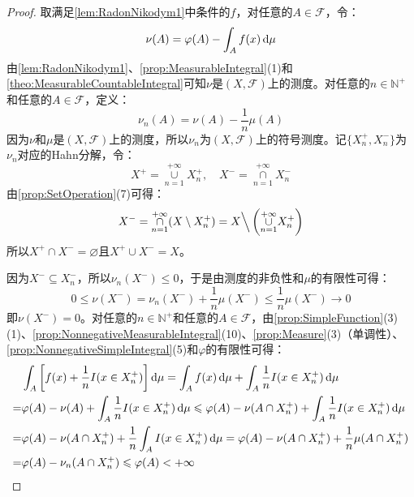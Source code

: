 \begin{proof}
	取满足\cref{lem:RadonNikodym1}中条件的$f$，对任意的$A\in\mathscr{F}$，令：
	\begin{equation*}
		\nu(A)=\varphi(A)-\int_{A}f(x)\mathop{}\!\mathrm{d}\mu
	\end{equation*}
	由\cref{lem:RadonNikodym1}、\cref{prop:MeasurableIntegral}(1)和\cref{theo:MeasurableCountableIntegral}可知$\nu$是$(X,\mathscr{F})$上的测度。对任意的$n\in\mathbb{N}^+$和任意的$A\in\mathscr{F}$，定义：
	\begin{equation*}
		\nu_n(A)=\nu(A)-\frac{1}{n}\mu(A)
	\end{equation*}
	因为$\nu$和$\mu$是$(X,\mathscr{F})$上的测度，所以$\nu_n$为$(X,\mathscr{F})$上的符号测度。记$\{X_n^+,X_n^-\}$为$\nu_n$对应的Hahn分解，令：
	\begin{equation*}
		X^+=\underset{n=1}{\overset{+\infty}{\cup}}X_n^+,\quad X^-=\underset{n=1}{\overset{+\infty}{\cap}}X_n^-
	\end{equation*}
	由\cref{prop:SetOperation}(7)可得：
	\begin{equation*}
		X^-=\underset{n=1}{\overset{+\infty}{\cap}}(X\setminus X_n^+)=X\Big\backslash\left(\underset{n=1}{\overset{+\infty}{\cup}}X_n^+\right)
	\end{equation*}
	所以$X^+\cap X^-=\varnothing$且$X^+\cup X^-=X$。\par
	因为$X^-\subseteq X_n^-$，所以$\nu_n(X^-)\leqslant0$，于是由测度的非负性和$\mu$的有限性可得：
	\begin{equation*}
		0\leqslant\nu(X^-)=\nu_n(X^-)+\frac{1}{n}\mu(X^-)\leqslant\frac{1}{n}\mu(X^-)\to0
	\end{equation*}
	即$\nu(X^-)=0$。对任意的$n\in\mathbb{N}^+$和任意的$A\in\mathscr{F}$，由\cref{prop:SimpleFunction}(3)(1)、\cref{prop:NonnegativeMeasurableIntegral}(10)、\cref{prop:Measure}(3)（单调性）、\cref{prop:NonnegativeSimpleIntegral}(5)和$\varphi$的有限性可得：
	\begin{align*}
		&\int_{A}\left[f(x)+\frac{1}{n}I(x\in X_n^+)\right]\mathop{}\!\mathrm{d}\mu=\int_{A}f(x)\mathop{}\!\mathrm{d}\mu+\int_{A}\frac{1}{n}I(x\in X_n^+)\mathop{}\!\mathrm{d}\mu \\
		=&\varphi(A)-\nu(A)+\int_{A}\frac{1}{n}I(x\in X_n^+)\mathop{}\!\mathrm{d}\mu\leqslant\varphi(A)-\nu(A\cap X_n^+)+\int_{A}\frac{1}{n}I(x\in X_n^+)\mathop{}\!\mathrm{d}\mu \\
		=&\varphi(A)-\nu(A\cap X_n^+)+\frac{1}{n}\int_{A}I(x\in X_n^+)\mathop{}\!\mathrm{d}\mu=\varphi(A)-\nu(A\cap X_n^+)+\frac{1}{n}\mu(A\cap X_n^+) \\
		=&\varphi(A)-\nu_n(A\cap X_n^+)\leqslant\varphi(A)<+\infty
	\end{align*}

\end{proof}
